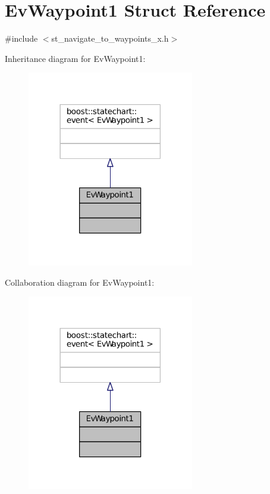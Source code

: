 \hypertarget{structEvWaypoint1}{}\section{Ev\+Waypoint1 Struct Reference}
\label{structEvWaypoint1}


{\ttfamily \#include $<$st\+\_\+navigate\+\_\+to\+\_\+waypoints\+\_\+x.\+h$>$}



Inheritance diagram for Ev\+Waypoint1\+:
\nopagebreak
\begin{figure}[H]
\begin{center}
\leavevmode
\includegraphics[width=206pt]{structEvWaypoint1__inherit__graph}
\end{center}
\end{figure}


Collaboration diagram for Ev\+Waypoint1\+:
\nopagebreak
\begin{figure}[H]
\begin{center}
\leavevmode
\includegraphics[width=206pt]{structEvWaypoint1__coll__graph}
\end{center}
\end{figure}


